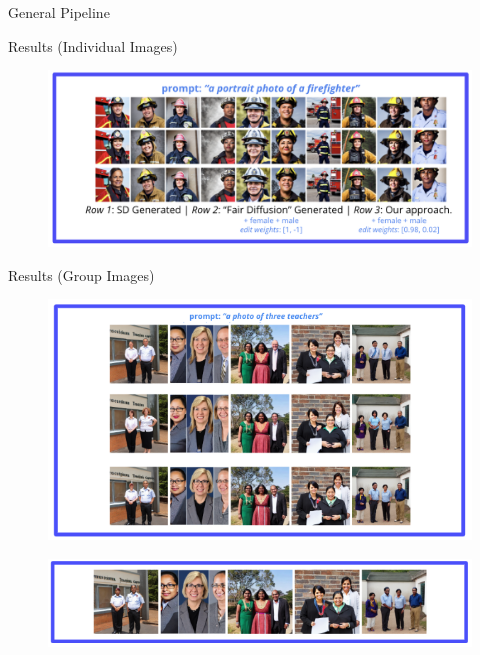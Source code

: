 \documentclass[final]{beamer}
\newlength{\twocolwid}
\begin{document}
\begin{frame}[t]
\begin{columns}[t]
\begin{column}{\twocolwid}
\begin{columns}[t,totalwidth=\twocolwid]
\begin{column}{\twocolwid}
\begin{block}{General Pipeline}
\end{block}
\vspace{-1cm}
\begin{block}{Results (Individual Images)}
    \begin{figure}
    \includegraphics[scale = 1.7]{IndividualFairness1.png}
    \end{figure}
\end{block}
\vspace{-1cm}
\begin{block}{Results (Group Images)}
    \begin{figure}
    \includegraphics[scale=1.4]{GroupFairness.png}
    \end{figure}

    \begin{figure}
    \includegraphics[scale=1.3]{GroupFairness_withRace1.png}
    \end{figure}
\end{block}


\end{column}
\end{columns}
\end{column}
\end{columns}
\end{frame}
\end{document}
